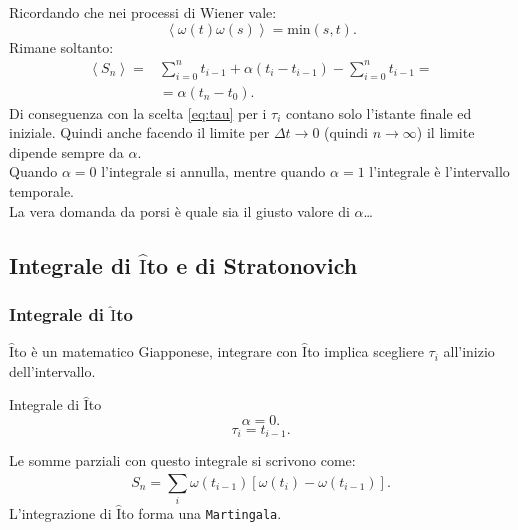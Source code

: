 Ricordando che nei processi di Wiener vale:
\[
    \left<\omega (t) \omega (s) \right> = \text{min}(s,t) 
.\] 
Rimane soltanto:
\[\begin{aligned}
    \left<S_n\right> =& \sum_{i=0}^{n} t_{i-1} + \alpha (t_i-t_{i-1}) -\sum_{i=0}^{n} t_{i-1} = \\
		      & =\alpha(t_n-t_0) 
.\end{aligned}\]
Di conseguenza con la scelta \ref{eq:tau} per i $\tau_i$ contano solo l'istante finale ed iniziale. Quindi anche facendo il limite per $\Delta t \to 0$ (quindi $n \to \infty$) il limite dipende sempre da $\alpha$. \\
Quando $\alpha =0$ l'integrale si annulla, mentre quando $\alpha =1$ l'integrale è l'intervallo temporale.\\
La vera domanda da porsi è quale sia il giusto valore di $\alpha$\ldots
\subsection{Integrale di $\hat{\text{I}}$to e di Stratonovich}%
\label{sub:Integrale di Ito e di Stratonovich}
\subsubsection{Integrale di $\hat{\text{I}}$to}%
\label{subsub:Integrale di Ito}
$\hat{\text{I}}$to è un matematico Giapponese, integrare con $\hat{\text{I}}$to implica scegliere $\tau_i$ all'inizio dell'intervallo.
\begin{bluebox}{Integrale di $\hat{\text{I}}$to}
    \[
        \alpha  = 0
    .\] 
    \[
	\tau_i = t_{i-1}
    .\] 
\end{bluebox}
\noindent
Le somme parziali con questo integrale si scrivono come:
\[
    S_n = \sum_{i}^{} \omega (t_{i-1}) \left[\omega (t_i) -\omega (t_{i-1}) \right]
.\]
L'integrazione di $\hat{\text{I}}$to forma una \texttt{Martingala}.
